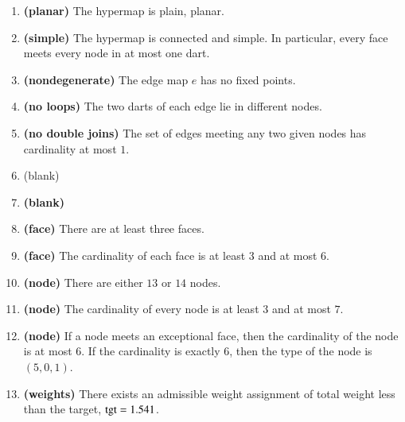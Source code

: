 \begin{enumerate}
    \label{definition:tame}
    \item {\bf (planar)} The hypermap is plain, planar.
    \item {\bf (simple)} The hypermap is connected and simple.  In particular, every face meets every node in at most one dart.
    \item {\bf (nondegenerate)} The edge map $e$ has no fixed points.
    \item {\bf (no loops)} The two darts of each edge lie in different nodes.
    \item {\bf (no double joins)} The set of edges meeting any two given nodes has cardinality at most $1$.
    \label{definition:tame:40}
    \item {(blank)}
\item {\bf (blank)}
  \item {\bf (face)} There are at least three faces.
    \item {\bf (face)} The cardinality of each face is at least $3$ and at most $6$.
    \label{definition:tame:length}
    \item {\bf (node)} There are either $13$ or $14$ nodes.
    \item {\bf (node)} The cardinality of every node is at least $3$ and at most
    $7$.
    \label{definition:tame:degree}
    \item {\bf (node)} If a node meets an exceptional face,
        then the cardinality of the node is at most $6$.  If the
        cardinality is exactly $6$, then the type of the node
        is $(5,0,1)$.
    \label{definition:tame:degreeE}
    \item {\bf (weights)} There exists an admissible weight assignment
        of total weight less than the target, ${\operatorname{tgt}}=1.541$.
    \label{definition:tame:squander}
\end{enumerate}
%

